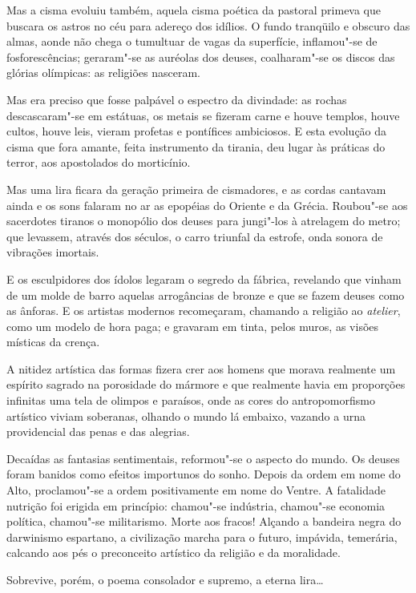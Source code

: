 Mas a cisma evoluiu também, aquela cisma
poética da pastoral primeva que buscara os astros no céu para adereço
dos idílios. O fundo tranqüilo e obscuro das almas, aonde não chega o
tumultuar de vagas da superfície, inflamou"-se de fosforescências;
geraram"-se as auréolas dos deuses, coalharam"-se os discos das
glórias olímpicas: as religiões nasceram. 

Mas era preciso que fosse
palpável o espectro da divindade: as rochas descascaram"-se em
estátuas, os metais se fizeram carne e houve templos, houve cultos,
houve leis, vieram profetas e pontífices ambiciosos. E esta evolução da
cisma que fora amante, feita instrumento da tirania, deu lugar às
práticas do terror, aos apostolados do morticínio. 

Mas uma lira ficara
da geração primeira de cismadores, e as cordas cantavam ainda e os sons
falaram no ar as epopéias do Oriente e da Grécia. Roubou"-se aos
sacerdotes tiranos o monopólio dos deuses para jungi"-los à atrelagem
do metro; que levassem, através dos séculos, o carro triunfal da
estrofe, onda sonora de vibrações imortais. 

E os esculpidores dos
ídolos legaram o segredo da fábrica, revelando que vinham de um molde
de barro aquelas arrogâncias de bronze e que se fazem deuses como as
ânforas. E os artistas modernos recomeçaram, chamando a religião ao
\textit{atelier}, como um modelo de hora paga; e gravaram em tinta, pelos muros,
as visões místicas da crença. 

A nitidez artística das formas fizera
crer aos homens que morava realmente um espírito sagrado na porosidade
do mármore e que realmente havia em proporções infinitas uma tela de
olimpos e paraísos, onde as cores do antropomorfismo artístico viviam
soberanas, olhando o mundo lá embaixo, vazando a urna providencial das
penas e das alegrias. 

Decaídas as fantasias sentimentais, reformou"-se
o aspecto do mundo. Os deuses foram banidos como efeitos importunos do
sonho. Depois da ordem em nome do Alto, proclamou"-se a ordem
positivamente em nome do Ventre. A fatalidade nutrição foi erigida em
princípio: chamou"-se indústria, chamou"-se economia política,
chamou"-se militarismo. Morte aos fracos! Alçando a bandeira negra do
darwinismo espartano, a civilização marcha para o futuro, impávida,
temerária, calcando aos pés o preconceito artístico da religião e da
moralidade. 

Sobrevive, porém, o poema consolador e supremo, a eterna
lira\ldots{} 

